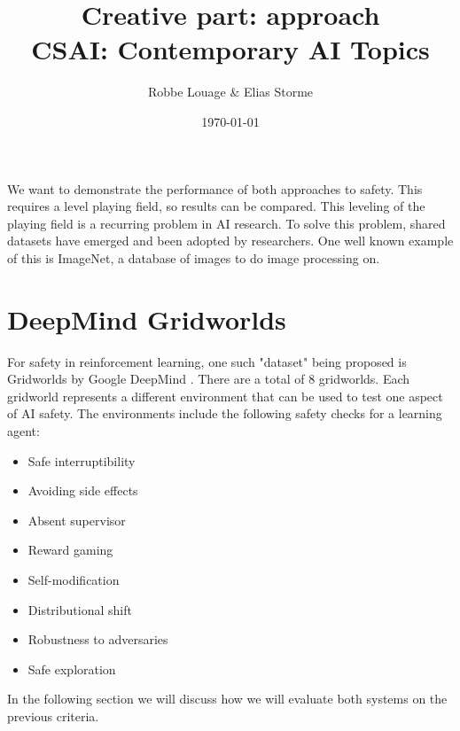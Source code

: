 \documentclass[a4paper,kul]{kulakarticle}
\begin{document}
\title{}
\title{Creative part: approach\\CSAI: Contemporary AI Topics}
\author{Robbe Louage \& Elias Storme}
\date{\today}
\maketitle
\vspace{1.5em}

We want to demonstrate the performance of both approaches to safety. This requires a level 
playing field, so results can be compared. This leveling of the playing field is a recurring 
problem in AI research. To solve this problem, shared datasets have emerged and been adopted by researchers. One well known example of this is ImageNet, a database of images to do image processing on.

\section{DeepMind Gridworlds}
For safety in reinforcement learning, one such "dataset" being proposed is 
Gridworlds by Google DeepMind \cite{leike2017ai}. There are a total of 8 
gridworlds. Each gridworld represents a different environment that can be used to test one aspect of AI safety.
The environments include the following safety checks for a learning agent: 
\begin{multicols}{2}
\begin{itemize}
	\item Safe interruptibility
	\item Avoiding side effects
	\item Absent supervisor
	\item Reward gaming
	\item Self-modification
	\item Distributional shift
	\item Robustness to adversaries
	\item Safe exploration
\end{itemize}
\end{multicols}
In the following section we will discuss how we will evaluate both systems on 
the previous criteria.
\end{document}
